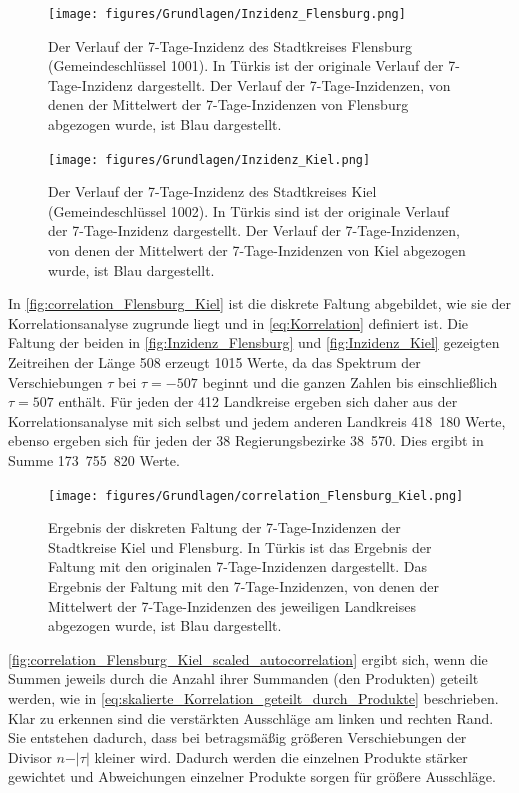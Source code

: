 \begin{figure}[H]
    \centering
    \texttt{[image: figures/Grundlagen/Inzidenz\_Flensburg.png]}
    \caption{Der Verlauf der 7-Tage-Inzidenz des Stadtkreises Flensburg (Gemeindeschlüssel 1001).
    In Türkis ist der originale Verlauf der 7-Tage-Inzidenz dargestellt. Der Verlauf der 7-Tage-Inzidenzen, von denen der Mittelwert der 7-Tage-Inzidenzen von Flensburg abgezogen wurde, ist Blau dargestellt.}
    \label{fig:Inzidenz_Flensburg}
\end{figure}
\begin{figure}[H]
    \centering
    \texttt{[image: figures/Grundlagen/Inzidenz\_Kiel.png]}
    \caption{Der Verlauf der 7-Tage-Inzidenz des Stadtkreises Kiel (Gemeindeschlüssel 1002).
    In Türkis sind ist der originale Verlauf der 7-Tage-Inzidenz dargestellt. Der Verlauf der 7-Tage-Inzidenzen, von denen der Mittelwert der 7-Tage-Inzidenzen von Kiel abgezogen wurde, ist Blau dargestellt.}
    \label{fig:Inzidenz_Kiel}
\end{figure}
In \autoref{fig:correlation_Flensburg_Kiel} ist die diskrete Faltung abgebildet, wie sie der Korrelationsanalyse zugrunde liegt und in \autoref{eq:Korrelation} definiert ist.
\newpage
Die Faltung der beiden in \autoref{fig:Inzidenz_Flensburg} und \autoref{fig:Inzidenz_Kiel} gezeigten Zeitreihen der Länge 508 erzeugt 1015 Werte, da das Spektrum der Verschiebungen $\tau$ bei $\tau=-507$ beginnt und die ganzen Zahlen bis einschließlich $\tau=507$ enthält.
Für jeden der 412 Landkreise ergeben sich daher aus der Korrelationsanalyse mit sich selbst und jedem anderen Landkreis 418~180 Werte, ebenso ergeben sich für jeden der 38 Regierungsbezirke 38~570. Dies ergibt in Summe 
173~755~820 Werte.
\begin{figure}[H]
    \centering
    \texttt{[image: figures/Grundlagen/correlation\_Flensburg\_Kiel.png]}
    \caption{Ergebnis der diskreten Faltung der 7-Tage-Inzidenzen der Stadtkreise Kiel und Flensburg.
    In Türkis ist das Ergebnis der Faltung mit den originalen 7-Tage-Inzidenzen dargestellt. Das Ergebnis der Faltung mit den 7-Tage-Inzidenzen, von denen der Mittelwert der 7-Tage-Inzidenzen des jeweiligen Landkreises abgezogen wurde, ist Blau dargestellt.}
    \label{fig:correlation_Flensburg_Kiel}
\end{figure}
\autoref{fig:correlation_Flensburg_Kiel_scaled_autocorrelation} ergibt sich, wenn die Summen jeweils durch die Anzahl ihrer Summanden (den Produkten) geteilt werden, wie in \autoref{eq:skalierte_Korrelation_geteilt_durch_Produkte} beschrieben. Klar zu erkennen sind die verstärkten Ausschläge am linken und rechten Rand. Sie entstehen dadurch, dass bei betragsmäßig größeren Verschiebungen der Divisor $n-\vert\tau\vert$ kleiner wird. Dadurch werden die einzelnen Produkte stärker gewichtet und Abweichungen einzelner Produkte sorgen für größere Ausschläge.
